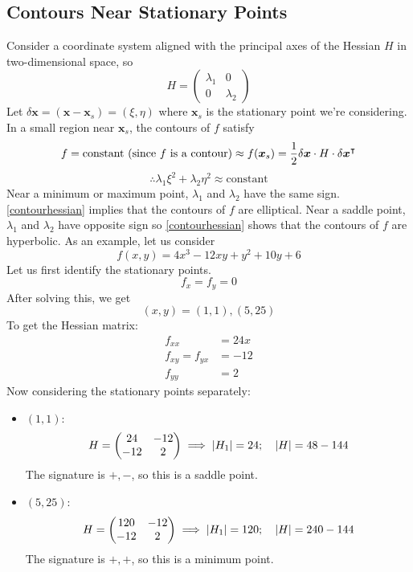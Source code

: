 \documentclass{article}
\begin{document}
\subsection{Contours Near Stationary Points}
Consider a coordinate system aligned with the principal axes of the Hessian $H$ in two-dimensional space, so
\[ H = \begin{pmatrix}
		\lambda_1 & 0 \\ 0 & \lambda_2
	\end{pmatrix} \]
Let $\delta \bm x = (\bm x - \bm x_s) = (\xi, \eta)$ where $\bm x_s$ is the stationary point we're considering. In a small region near $\bm x_s$, the contours of $f$ satisfy
\[ f = \text{constant (since $f$ is a contour)} \approx f(\bm x_s) = \frac{1}{2}\delta \bm x \cdot H \cdot \delta \bm x^\intercal \]
\begin{equation}\label{contourhessian}
	\therefore \lambda_1 \xi^2 + \lambda_2 \eta^2 \approx \text{constant}
\end{equation}
Near a minimum or maximum point, $\lambda_1$ and $\lambda_2$ have the same sign. \eqref{contourhessian} implies that the contours of $f$ are elliptical. Near a saddle point, $\lambda_1$ and $\lambda_2$ have opposite sign so \eqref{contourhessian} shows that the contours of $f$ are hyperbolic. As an example, let us consider
\[ f(x,y) = 4x^3 - 12xy + y^2 + 10y + 6 \]
Let us first identify the stationary points.
\[ f_x = f_y = 0 \]
After solving this, we get
\[ (x,y) = (1, 1), (5, 25) \]
To get the Hessian matrix:
\begin{align*}
	f_{xx}          & = 24x \\
	f_{xy} = f_{yx} & = -12 \\
	f_{yy}          & = 2
\end{align*}
Now considering the stationary points separately:
\begin{itemize}
	\item $(1, 1)$:
	      \[ H = \begin{pmatrix}
			      24 & -12 \\ -12 & 2
		      \end{pmatrix} \implies \abs{H_1} = 24;\quad \abs{H} = 48-144 \]
	      The signature is $+, -$, so this is a saddle point.
	\item $(5, 25)$:
	      \[ H = \begin{pmatrix}
			      120 & -12 \\ -12 & 2
		      \end{pmatrix} \implies \abs{H_1} = 120;\quad \abs{H} = 240-144 \]
	      The signature is $+, +$, so this is a minimum point.
\end{itemize}
\end{document}
